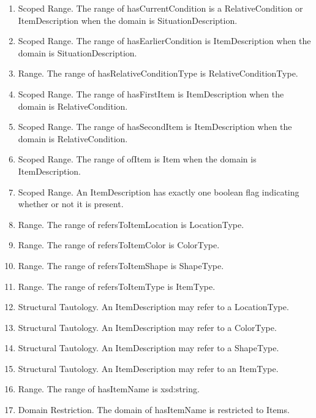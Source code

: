 \begin{enumerate}
\item Scoped Range. The range of hasCurrentCondition is a RelativeCondition or ItemDescription when the domain is SituationDescription.
\item Scoped Range. The range of hasEarlierCondition is ItemDescription when the domain is SituationDescription.
\item Range. The range of hasRelativeConditionType is RelativeConditionType.
\item Scoped Range. The range of hasFirstItem is ItemDescription when the domain is RelativeCondition.
\item Scoped Range. The range of hasSecondItem is ItemDescription when the domain is RelativeCondition.
\item Scoped Range. The range of ofItem is Item when the domain is ItemDescription.
\item Scoped Range. An ItemDescription has exactly one boolean flag indicating whether or not it is present.
\item Range. The range of refersToItemLocation is LocationType.
\item Range. The range of refersToItemColor is ColorType.
\item Range. The range of refersToItemShape is ShapeType.
\item Range. The range of refersToItemType is ItemType.
\item Structural Tautology. An ItemDescription may refer to a LocationType.
\item Structural Tautology. An ItemDescription may refer to a ColorType.
\item Structural Tautology. An ItemDescription may refer to a ShapeType.
\item Structural Tautology. An ItemDescription may refer to an ItemType.
\item Range. The range of hasItemName is xsd:string.
\item Domain Restriction. The domain of hasItemName is restricted to Items.
\end{enumerate}



